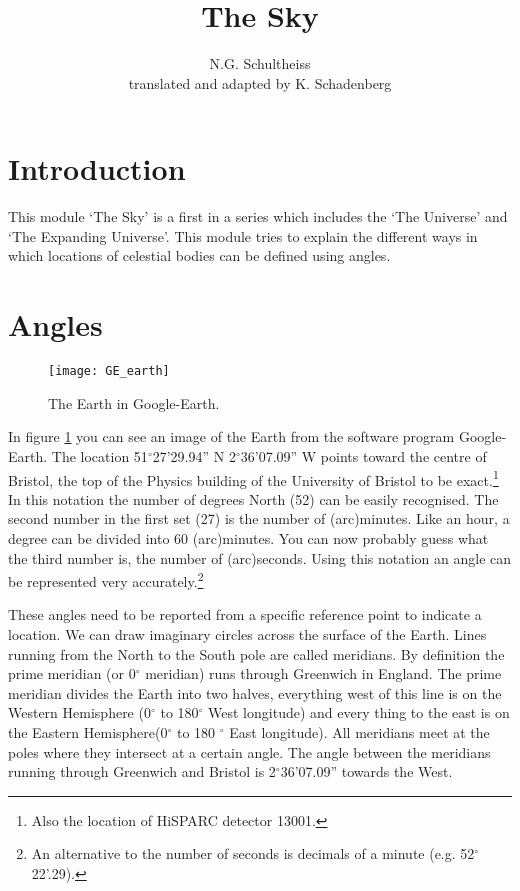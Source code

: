


\author{N.G. Schultheiss \\ translated and adapted by K. Schadenberg}
\date{}
\title{The Sky}



\maketitle

\section{Introduction}
This module `The Sky' is a first in a series which includes the `The Universe' and `The Expanding Universe'. This module tries to explain the different ways in which locations of celestial bodies can be defined using angles.

\section{Angles}
\begin{figure}\begin{center}
\texttt{[image: GE\_earth]}
\caption{The Earth in Google-Earth.}\label{fig:GE_earth}
\end{center}\end{figure} 

In figure \ref{fig:GE_earth} you can see an image of the Earth from the software program Google-Earth. The location 51$^{\circ}$27'29.94'' N 2$^{\circ}$36'07.09'' W points toward the centre of Bristol, the top of the Physics building of the University of Bristol to be exact.\footnote{Also the location of HiSPARC detector 13001.} In this notation the number of degrees North (52) can be easily recognised. The second number in the first set (27) is the number of (arc)minutes. Like an hour, a degree can be divided into 60 (arc)minutes. You can now probably guess what the third number is, the number of (arc)seconds. Using this notation an angle can be represented very accurately.\footnote{An alternative to the number of seconds is decimals of a minute (e.g. 52$^{\circ}$22'.29).}

These angles need to be reported from a specific reference point to indicate a location. We can draw imaginary circles across the surface of the Earth. Lines running from the North to the South pole are called meridians. By definition the prime meridian (or 0$^{\circ}$ meridian) runs through Greenwich in England. The prime meridian divides the Earth into two halves, everything west of this line is on the Western Hemisphere (0$^{\circ}$ to 180$^{\circ}$ West longitude) and every thing to the east is on the Eastern Hemisphere(0$^{\circ}$ to 180 $^{\circ}$ East longitude). All meridians meet at the poles where they intersect at a certain angle. The angle between the meridians running through Greenwich and Bristol is 2$^{\circ}$36'07.09'' towards the West.

